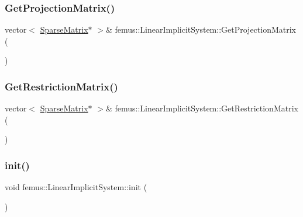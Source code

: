 \subsubsection{\texorpdfstring{Get\+Projection\+Matrix()}{GetProjectionMatrix()}}
{\footnotesize\ttfamily vector$<$ \mbox{\hyperlink{classfemus_1_1_sparse_matrix}{Sparse\+Matrix}}$\ast$ $>$\& femus\+::\+Linear\+Implicit\+System\+::\+Get\+Projection\+Matrix (\begin{DoxyParamCaption}{ }\end{DoxyParamCaption})\hspace{0.3cm}{\ttfamily [inline]}}

\mbox{\label{classfemus_1_1_linear_implicit_system_a560cf9fb486ce2fb253ca32df4435b64}} 
\subsubsection{\texorpdfstring{Get\+Restriction\+Matrix()}{GetRestrictionMatrix()}}
{\footnotesize\ttfamily vector$<$ \mbox{\hyperlink{classfemus_1_1_sparse_matrix}{Sparse\+Matrix}}$\ast$ $>$\& femus\+::\+Linear\+Implicit\+System\+::\+Get\+Restriction\+Matrix (\begin{DoxyParamCaption}{ }\end{DoxyParamCaption})\hspace{0.3cm}{\ttfamily [inline]}}

\mbox{\label{classfemus_1_1_linear_implicit_system_a4605bac9ea670bb7dbd4454358155670}} 
\subsubsection{\texorpdfstring{init()}{init()}}
{\footnotesize\ttfamily void femus\+::\+Linear\+Implicit\+System\+::init (\begin{DoxyParamCaption}{ }\end{DoxyParamCaption})\hspace{0.3cm}{\ttfamily [virtual]}}

